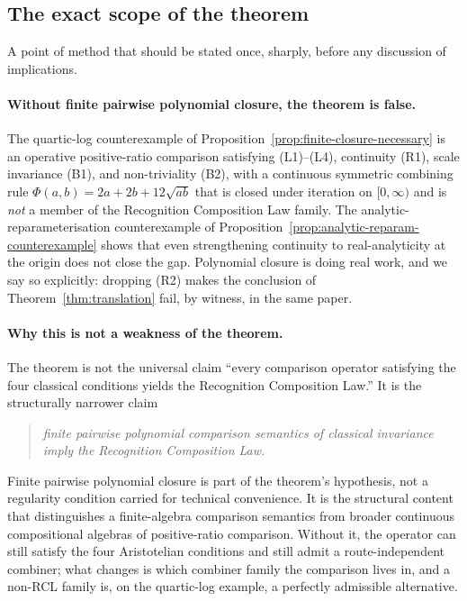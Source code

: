 \documentclass[11pt,a4paper]{article}
\theoremstyle{definition}
\theoremstyle{remark}
\begin{document}
\subsection{The exact scope of the theorem}\label{subsec:scope-statement}

A point of method that should be stated once, sharply, before any
discussion of implications.

\paragraph{Without finite pairwise polynomial closure, the theorem is
false.} The quartic-log counterexample of
Proposition~\ref{prop:finite-closure-necessary} is an operative
positive-ratio comparison satisfying (L1)--(L4), continuity (R1),
scale invariance (B1), and non-triviality (B2), with a continuous
symmetric combining rule $\Phi(a, b) = 2a + 2b + 12\sqrt{ab}$ that is
closed under iteration on $[0, \infty)$ and is \emph{not} a member of
the Recognition Composition Law family. The analytic-reparameterisation
counterexample of Proposition~\ref{prop:analytic-reparam-counterexample}
shows that even strengthening continuity to real-analyticity at the
origin does not close the gap. Polynomial closure is doing real work,
and we say so explicitly: dropping (R2) makes the conclusion of
Theorem~\ref{thm:translation} fail, by witness, in the same paper.

\paragraph{Why this is not a weakness of the theorem.} The theorem is
not the universal claim ``every comparison operator satisfying the
four classical conditions yields the Recognition Composition Law.''
It is the structurally narrower claim
\begin{quote}
\itshape
finite pairwise polynomial comparison semantics of classical
invariance imply the Recognition Composition Law.
\end{quote}
Finite pairwise polynomial closure is part of the theorem's hypothesis,
not a regularity condition carried for technical convenience. It is
the structural content that distinguishes a finite-algebra comparison
semantics from broader continuous compositional algebras of
positive-ratio comparison. Without it, the operator can still satisfy
the four Aristotelian conditions and still admit a route-independent
combiner; what changes is which combiner family the comparison lives
in, and a non-RCL family is, on the quartic-log example, a perfectly
admissible alternative.
\end{document}
